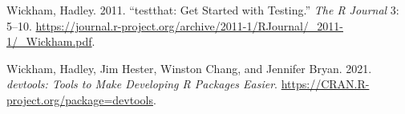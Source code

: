 \begin{CSLReferences}{1}{0}
\leavevmode{}%
Wickham, Hadley. 2011. {``{testthat: Get Started with Testing}.''} \emph{The R Journal} 3: 5--10. \url{https://journal.r-project.org/archive/2011-1/RJournal/_2011-1/_Wickham.pdf}.

\leavevmode{}%
Wickham, Hadley, Jim Hester, Winston Chang, and Jennifer Bryan. 2021. \emph{{devtools: Tools to Make Developing R Packages Easier}}. \url{https://CRAN.R-project.org/package=devtools}.

\end{CSLReferences}


\address{%
John C. Nash\\
retired professor, University of Ottawa\\%
Telfer School of Management\\ Ottawa ON Canada K1N 6N5\\
%
%
\textit{ORCiD: \href{https://orcid.org/0000-0002-2762-8039}{0000-0002-2762-8039}}\\%
\href{mailto:profjcnash@gmail.com}{\nolinkurl{profjcnash@gmail.com}}%
}

\address{%
Arkajyoti Bhattacharjee\\
Indian Institute of Technology\\%
Department of Mathematics and Statistics\\ Kanpur\\
%
%
%
\href{mailto:arkastat98@gmail.com}{\nolinkurl{arkastat98@gmail.com}}%
}
